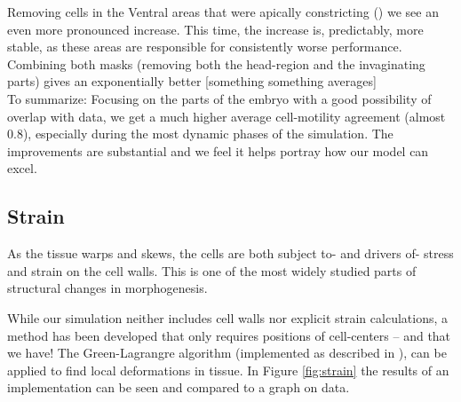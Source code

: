 Removing cells in the Ventral areas that were apically constricting () we see an even more pronounced increase. This time, the increase is, predictably, more stable, as these areas are responsible for consistently worse performance. \\

Combining both masks (removing both the head-region and the  invaginating parts) gives an exponentially better [something something averages] \\


To summarize: Focusing on the parts of the embryo with a good possibility of overlap with data, we get a much higher average cell-motility agreement (almost 0.8), especially during the most dynamic phases of the simulation. The improvements are substantial and we feel it helps portray how our model can excel.




\subsection{Strain}
As the tissue warps and skews, the cells are both subject to- and drivers of- stress and strain on the cell walls. This is one of the most widely studied parts of structural changes in morphogenesis.

While our simulation neither includes cell walls nor explicit strain calculations, a method has been developed that only requires positions of cell-centers -- and that we have! The Green-Lagrangre algorithm (implemented as described in ), can be applied to find local deformations in tissue. In Figure \ref{fig:strain} the results of an implementation can be seen and compared to a graph on data.

